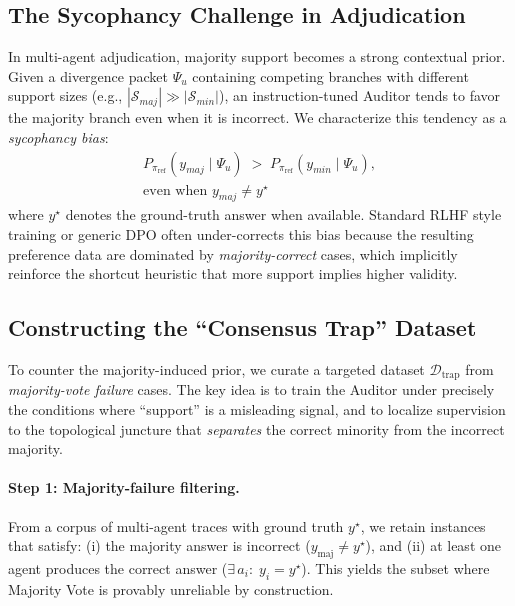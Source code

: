 \documentclass{article}
\theoremstyle{plain}
\theoremstyle{definition}
\theoremstyle{remark}
\begin{document}
\subsection{The Sycophancy Challenge in Adjudication}
In multi-agent adjudication, majority support becomes a strong contextual prior. Given a divergence packet $\Psi_u$ containing competing branches with different support sizes (e.g., $|\mathcal{S}_{maj}| \gg |\mathcal{S}_{min}|$), an instruction-tuned Auditor tends to favor the majority branch even when it is incorrect. We characterize this tendency as a \textit{sycophancy bias}:
\begin{equation}
\begin{aligned}
    P_{\pi_{\mathrm{ref}}}\!\left(y_{maj}\mid \Psi_u\right)
    \;>\;
    P_{\pi_{\mathrm{ref}}}\!\left(y_{min}\mid \Psi_u\right), \\
    \text{even when } y_{maj} \neq y^\star
\end{aligned}
\end{equation}
where $y^\star$ denotes the ground-truth answer when available. Standard RLHF style training or generic DPO often under-corrects this bias because the resulting preference data are dominated by \emph{majority-correct} cases, which implicitly reinforce the shortcut heuristic that more support implies higher validity. 


\subsection{Constructing the ``Consensus Trap'' Dataset}
To counter the majority-induced prior, we curate a targeted dataset $\mathcal{D}_{\mathrm{trap}}$ from \emph{majority-vote failure} cases. The key idea is to train the Auditor under precisely the conditions where ``support'' is a misleading signal, and to localize supervision to the topological juncture that \emph{separates} the correct minority from the incorrect majority.

\paragraph{Step 1: Majority-failure filtering.}
From a corpus of multi-agent traces with ground truth $y^\star$, we retain instances that satisfy:
(i) the majority answer is incorrect ($y_{\mathrm{maj}} \neq y^\star$), and
(ii) at least one agent produces the correct answer ($\exists\, a_i:\; y_i = y^\star$).
This yields the subset where Majority Vote is provably unreliable by construction.
\end{document}
